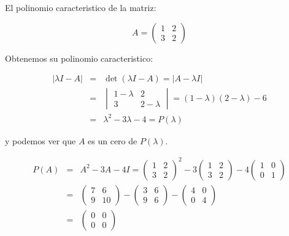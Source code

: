 	\begin{ejemplo}
		El polinomio caracteristico de la matriz:

		\begin{equation*}
			A =
			\begin{pmatrix}
				1 & 2 \\
				3 & 2
			\end{pmatrix}
		\end{equation*}

		Obtenemos su polinomio caracteristico:

		\begin{eqnarray*}
			|\lambda I - A| & = & \det{(\lambda I - A)} = |A - \lambda I| \\
			& = &
			\begin{vmatrix}
				1 - \lambda & 2 \\
				3 & 2 - \lambda
			\end{vmatrix} = (1 - \lambda)(2 - \lambda) - 6 \\
			& = & \lambda^2 - 3 \lambda - 4 = P(\lambda)
		\end{eqnarray*}

		y podemos ver que $A$ es un cero de $P(\lambda)$.

		\begin{eqnarray*}
			P(A) & = & A^2 - 3 A - 4I =
			\begin{pmatrix}
				1 & 2 \\
				3 & 2
			\end{pmatrix}^2 - 3
			\begin{pmatrix}
				1 & 2 \\
				3 & 2
			\end{pmatrix} - 4
			\begin{pmatrix}
				1 & 0 \\
				0 & 1
			\end{pmatrix} \\
			& = &
			\begin{pmatrix}
				7 & 6 \\
				9 & 10
			\end{pmatrix} -
			\begin{pmatrix}
				3 & 6 \\
				9 & 6
			\end{pmatrix} -
			\begin{pmatrix}
				4 & 0 \\
				0 & 4
			\end{pmatrix} \\
			& = &
			\begin{pmatrix}
				0 & 0 \\
				0 & 0
			\end{pmatrix}
		\end{eqnarray*}
	\end{ejemplo}

